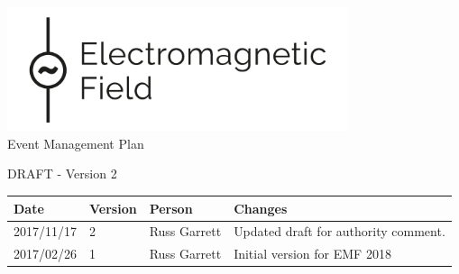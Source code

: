 

\newcommand{\st}{\superscript{st} }
\newcommand{\nd}{\superscript{nd} }
\renewcommand{\th}{\superscript{th} }
\newcommand{\rd}{\superscript{rd} }




\begin{titlepage}
\thispagestyle{empty}
\begin{center}
    \includegraphics[width=10cm]{emf-logo.png}\\[48pt]
{\Large Event Management Plan}

DRAFT - Version 2

\vfill

\begin{tabular}{l | l | l | p{10cm}}
  Date & Version & Person & Changes \\
  \hline
  2017/11/17 & 2 & Russ Garrett & Updated draft for authority comment. \\
  2017/02/26 & 1 & Russ Garrett & Initial version for EMF 2018 \\
\end{tabular}

\end{center}
\end{titlepage}

\tableofcontents

\newpage



